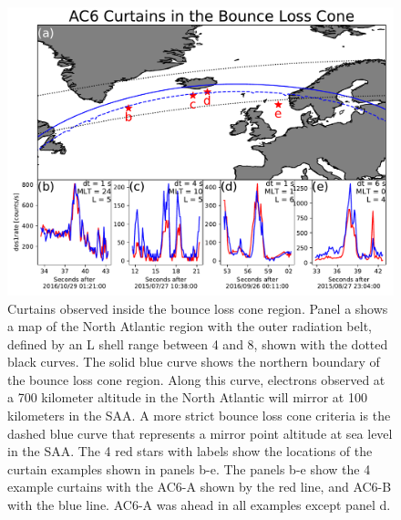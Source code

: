 \documentclass[draft]{agujournal2019}
\begin{document}
\begin{figure}
\includegraphics[width=\textwidth]{fig3.pdf}
\caption{Curtains observed inside the bounce loss cone region. Panel a shows a map of the North Atlantic region with the outer radiation belt, defined by an L shell range between 4 and 8, shown with the dotted black curves. The solid blue curve shows the northern boundary of the bounce loss cone region. Along this curve, electrons observed at a 700 kilometer altitude in the North Atlantic will mirror at 100 kilometers in the SAA. A more strict bounce loss cone criteria is the dashed blue curve that represents a mirror point altitude at sea level in the SAA. The 4 red stars with labels show the locations of the curtain examples shown in panels b-e. The panels b-e show the 4 example curtains with the AC6-A shown by the red line, and AC6-B with the blue line. AC6-A was ahead in all examples except panel d.}
\label{fig3}
\end{figure}
\end{document}
